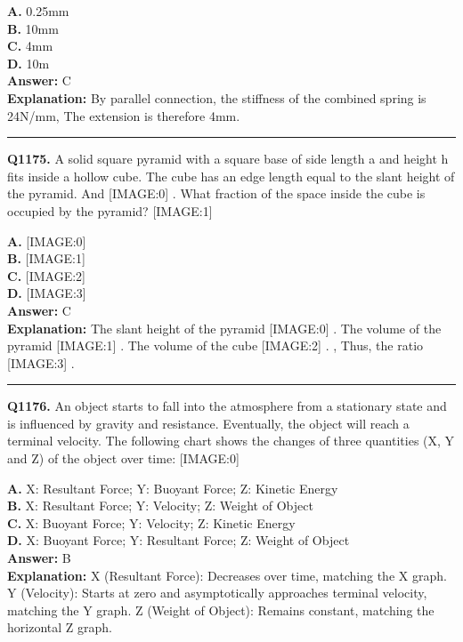 \documentclass[12pt]{article}
\begin{document}
\textbf{A.} 0.25mm \\
\textbf{B.} 10mm \\
\textbf{C.} 4mm \\
\textbf{D.} 10m \\

\textbf{Answer:} C \\
\textbf{Explanation:} By parallel connection, the stiffness of the combined spring is 24N/mm, The extension is therefore 4mm.

\hrule
\vspace{1em}


\noindent
\textbf{Q1175.} A solid square pyramid with a square base of side length a
and height h
fits inside a hollow cube. The cube has an edge length equal to the slant height of the pyramid. And
[IMAGE:0]
. What fraction of the space inside the cube is occupied by the pyramid?
[IMAGE:1]



\textbf{A.} [IMAGE:0] \\
\textbf{B.} [IMAGE:1] \\
\textbf{C.} [IMAGE:2] \\
\textbf{D.} [IMAGE:3] \\

\textbf{Answer:} C \\
\textbf{Explanation:} The slant height of the pyramid
[IMAGE:0]
. The volume of the pyramid
[IMAGE:1]
. The volume of the cube
[IMAGE:2]
. , Thus, the ratio
[IMAGE:3]
.

\hrule
\vspace{1em}


\noindent
\textbf{Q1176.} An object starts to fall into the atmosphere from a stationary state and is influenced by gravity and resistance. Eventually, the object will reach a terminal velocity. The following chart shows the changes of three quantities (X, Y and Z) of the object over time:
[IMAGE:0]



\textbf{A.} X: Resultant Force; Y: Buoyant Force; Z: Kinetic Energy \\
\textbf{B.} X: Resultant Force; Y: Velocity; Z: Weight of Object \\
\textbf{C.} X: Buoyant Force; Y: Velocity; Z: Kinetic Energy \\
\textbf{D.} X: Buoyant Force; Y: Resultant Force; Z: Weight of Object \\

\textbf{Answer:} B \\
\textbf{Explanation:} X (Resultant Force): Decreases over time, matching the X graph.
Y (Velocity): Starts at zero and asymptotically approaches terminal velocity, matching the Y graph.
Z (Weight of Object): Remains constant, matching the horizontal Z graph.
\end{document}
